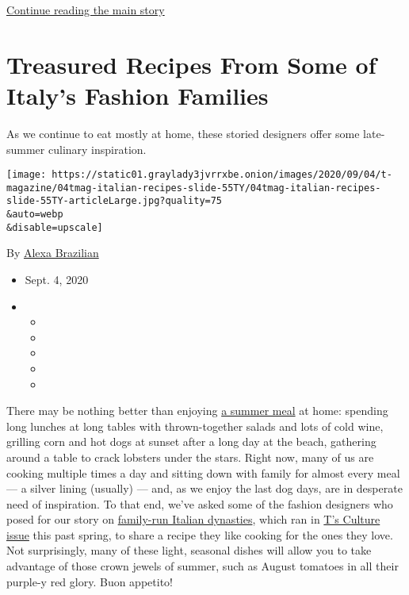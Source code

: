\protect\hyperlink{after-sponsor}{Continue reading the main story}

\hypertarget{treasured-recipes-from-some-of-italys-fashion-families}{%
\section{Treasured Recipes From Some of Italy's Fashion
Families}\label{treasured-recipes-from-some-of-italys-fashion-families}}

As we continue to eat mostly at home, these storied designers offer some
late-summer culinary inspiration.

\texttt{[image: https://static01.graylady3jvrrxbe.onion/images/2020/09/04/t-magazine/04tmag-italian-recipes-slide-55TY/04tmag-italian-recipes-slide-55TY-articleLarge.jpg?quality=75\\\&auto=webp\\\&disable=upscale]}

By \href{https://www.nytimes3xbfgragh.onion/by/alexa-brazilian}{Alexa
Brazilian}

\begin{itemize}
\item
  Sept. 4, 2020
\item
  \begin{itemize}
  \item
  \item
  \item
  \item
  \item
  \end{itemize}
\end{itemize}

There may be nothing better than enjoying
\href{https://www.nytimes3xbfgragh.onion/column/one-good-meal}{a summer
meal} at home: spending long lunches at long tables with thrown-together
salads and lots of cold wine, grilling corn and hot dogs at sunset after
a long day at the beach, gathering around a table to crack lobsters
under the stars. Right now, many of us are cooking multiple times a day
and sitting down with family for almost every meal --- a silver lining
(usually) --- and, as we enjoy the last dog days, are in desperate need
of inspiration. To that end, we've asked some of the fashion designers
who posed for our story on
\href{https://www.nytimes3xbfgragh.onion/interactive/2020/04/13/t-magazine/italian-fashion-design-houses.html}{family-run
Italian dynasties}, which ran in
\href{https://www.nytimes3xbfgragh.onion/interactive/2020/04/13/t-magazine/culture-issue-2020.html}{T's
Culture issue} this past spring, to share a recipe they like cooking for
the ones they love. Not surprisingly, many of these light, seasonal
dishes will allow you to take advantage of those crown jewels of summer,
such as August tomatoes in all their purple-y red glory. Buon appetito!

